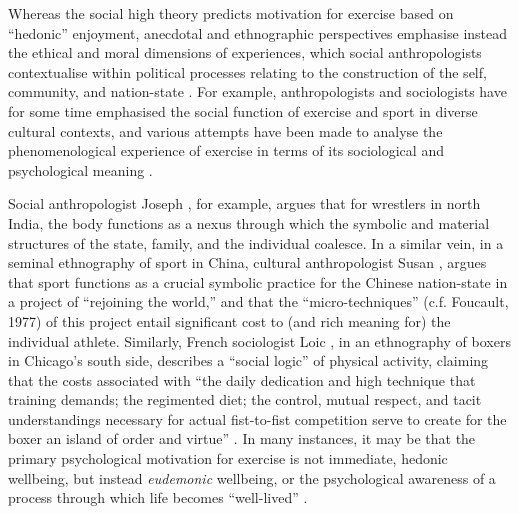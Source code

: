 \begin{CJK}{UTF8}{gbsn}
Whereas the social high theory predicts motivation for exercise based on ``hedonic'' enjoyment, anecdotal and ethnographic perspectives emphasise instead the ethical and moral dimensions of experiences, which social anthropologists contextualise within political processes relating to the construction of the self, community, and nation-state \citep{Alter1993,Brownell1995,Downey2005,Wacquant2004}.
For example, anthropologists and sociologists have for some time emphasised the social function of exercise and sport in diverse cultural contexts, and various attempts have been made to analyse the phenomenological experience of exercise in terms of its sociological and psychological meaning \citep{Bourdieu1978}.

Social anthropologist Joseph \textcite{Alter1993}, for example, argues that for wrestlers in north India, the body functions as a nexus through which the symbolic and material structures of the state, family, and the individual coalesce.  In a similar vein, in a seminal ethnography of sport in China, cultural anthropologist Susan \textcite{Brownell1995}, argues that sport functions as a crucial symbolic practice for the Chinese nation-state in a project of ``rejoining the world,'' and that the ``micro-techniques'' (c.f. Foucault, 1977) of this project entail significant cost to (and rich meaning for) the individual athlete.   Similarly, French sociologist Loic \textcite{Wacquant2004}, in an ethnography of boxers in Chicago's south side, describes a ``social logic'' of physical activity, claiming that the costs associated with ``the daily dedication and high technique that training demands; the regimented diet; the control, mutual respect, and tacit understandings necessary for actual fist-to-fist competition serve to create for the boxer an island of order and virtue'' \citep[17]{Wacquant2004}. In many instances, it may be that the primary psychological motivation for exercise is not immediate, hedonic wellbeing, but instead \textit{eudemonic} wellbeing, or the psychological awareness of a process through which life becomes ``well-lived'' \citep{Fave2009,Huta2013}.


\end{CJK}
